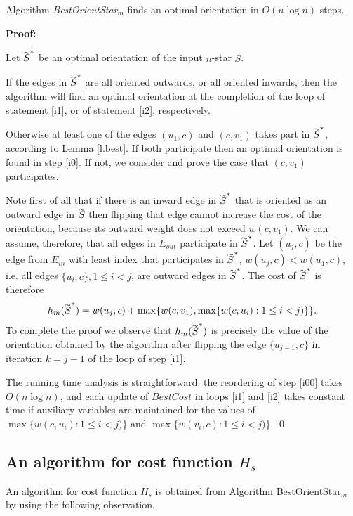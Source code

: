 \begin{theorem}\label{t.star}
Algorithm \emph{BestOrientStar}$_m$ finds an optimal orientation in  $O(n \log n)$ steps.
\end{theorem}  

\noindent \textbf{Proof:}

 Let $\tildeb{S}^*$ be an optimal orientation of the input $n$-star $S$.
 
 If the edges in $\tildeb{S}^*$ are all oriented outwards, or all oriented 
 inwards, then the algorithm will find an optimal orientation
 at the completion of the loop of statement \ref{i1}, or
of statement \ref{i2}, respectively.
 
 Otherwise at least one of the edges $(u_1,c)$ and $(c,v_1)$ takes part 
 in $\tildeb{S}^*$, according to Lemma \ref{l.best}. If both participate then an optimal orientation is found in step \ref{i0}.
 If not, we consider and prove the case that $(c,v_1)$ participates. 
 
 Note first of all that if there is an inward edge in $\tildeb{S}^*$ that is oriented as
 an outward edge in $\tildeb{S}$ then flipping that edge cannot
 increase the cost of the orientation, because its outward weight does not exceed $w(c,v_1)$.
 We can assume, therefore, that all edges in $E_{out}$ participate in $\tildeb{S}^*$. 
 Let $(u_j,c)$ be the 
 edge from $E_{in}$ with least index that participates in $\tildeb{S}^*$, 
  $w(u_j,c)<w(u_1,c)$, i.e. all edges $\{u_i,c\}, 1\leq i<j$, are outward edges in $\tildeb{S}^*$. 
 The cost of $\tildeb{S}^*$ is therefore 
 $$h_m(\tildeb{S}^*)=w(u_j,c)+\max \{w(c,v_1),\max \{w(c,u_i):1\leq i<j)\}\}.$$
To complete the proof we observe that $h_m(\tildeb{S}^*)$ is precisely the value of the orientation
obtained by the algorithm after flipping the edge  $\{u_{j-1},c\}$
 in iteration $k=j-1$ of the loop of step \ref{i1}.

The running time  analysis is straightforward: the reordering of step \ref{i00} takes
$O(n \log n)$, and each update of $BestCost$ in loops \ref{i1} and \ref{i2} takes 
constant time if  auxiliary variables are maintained for the values of 
$\max \{w(c,u_i):1\leq i<j)\}$ and $\max \{w(v_i,c):1\leq i<j)\}$.
 \qed
 
  \subsection{An algorithm for cost function $H_s$}\label{ss:ss}
  An algorithm for cost function $H_s$ is obtained from Algorithm BestOrientStar$_m$ by 
  using the following observation.
  
